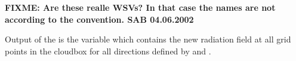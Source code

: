 {\Large \bf FIXME: Are these realle WSVs? In that case the names are
  not according to the convention. SAB 04.06.2002}

Output of the  is the variable 
 which contains the new radiation field at all
grid points in the cloudbox for all directions defined by 
 and .

\label{sec:scattering:conv_method}





 


